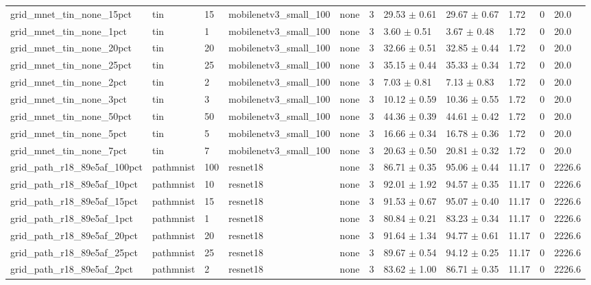 \begin{tabular}{lllllllllll}
grid_mnet_tin_none_15pct & tin & 15 & mobilenetv3_small_100 & none & 3 & 29.53 $\pm$ 0.61 & 29.67 $\pm$ 0.67 & 1.72 & 0 & 20.0 \\
grid_mnet_tin_none_1pct & tin & 1 & mobilenetv3_small_100 & none & 3 & 3.60 $\pm$ 0.51 & 3.67 $\pm$ 0.48 & 1.72 & 0 & 20.0 \\
grid_mnet_tin_none_20pct & tin & 20 & mobilenetv3_small_100 & none & 3 & 32.66 $\pm$ 0.51 & 32.85 $\pm$ 0.44 & 1.72 & 0 & 20.0 \\
grid_mnet_tin_none_25pct & tin & 25 & mobilenetv3_small_100 & none & 3 & 35.15 $\pm$ 0.44 & 35.33 $\pm$ 0.34 & 1.72 & 0 & 20.0 \\
grid_mnet_tin_none_2pct & tin & 2 & mobilenetv3_small_100 & none & 3 & 7.03 $\pm$ 0.81 & 7.13 $\pm$ 0.83 & 1.72 & 0 & 20.0 \\
grid_mnet_tin_none_3pct & tin & 3 & mobilenetv3_small_100 & none & 3 & 10.12 $\pm$ 0.59 & 10.36 $\pm$ 0.55 & 1.72 & 0 & 20.0 \\
grid_mnet_tin_none_50pct & tin & 50 & mobilenetv3_small_100 & none & 3 & 44.36 $\pm$ 0.39 & 44.61 $\pm$ 0.42 & 1.72 & 0 & 20.0 \\
grid_mnet_tin_none_5pct & tin & 5 & mobilenetv3_small_100 & none & 3 & 16.66 $\pm$ 0.34 & 16.78 $\pm$ 0.36 & 1.72 & 0 & 20.0 \\
grid_mnet_tin_none_7pct & tin & 7 & mobilenetv3_small_100 & none & 3 & 20.63 $\pm$ 0.50 & 20.81 $\pm$ 0.32 & 1.72 & 0 & 20.0 \\
grid_path_r18_89e5af_100pct & pathmnist & 100 & resnet18 & none & 3 & 86.71 $\pm$ 0.35 & 95.06 $\pm$ 0.44 & 11.17 & 0 & 2226.6 \\
grid_path_r18_89e5af_10pct & pathmnist & 10 & resnet18 & none & 3 & 92.01 $\pm$ 1.92 & 94.57 $\pm$ 0.35 & 11.17 & 0 & 2226.6 \\
grid_path_r18_89e5af_15pct & pathmnist & 15 & resnet18 & none & 3 & 91.53 $\pm$ 0.67 & 95.07 $\pm$ 0.40 & 11.17 & 0 & 2226.6 \\
grid_path_r18_89e5af_1pct & pathmnist & 1 & resnet18 & none & 3 & 80.84 $\pm$ 0.21 & 83.23 $\pm$ 0.34 & 11.17 & 0 & 2226.6 \\
grid_path_r18_89e5af_20pct & pathmnist & 20 & resnet18 & none & 3 & 91.64 $\pm$ 1.34 & 94.77 $\pm$ 0.61 & 11.17 & 0 & 2226.6 \\
grid_path_r18_89e5af_25pct & pathmnist & 25 & resnet18 & none & 3 & 89.67 $\pm$ 0.54 & 94.12 $\pm$ 0.25 & 11.17 & 0 & 2226.6 \\
grid_path_r18_89e5af_2pct & pathmnist & 2 & resnet18 & none & 3 & 83.62 $\pm$ 1.00 & 86.71 $\pm$ 0.35 & 11.17 & 0 & 2226.6 \\

\end{tabular}
